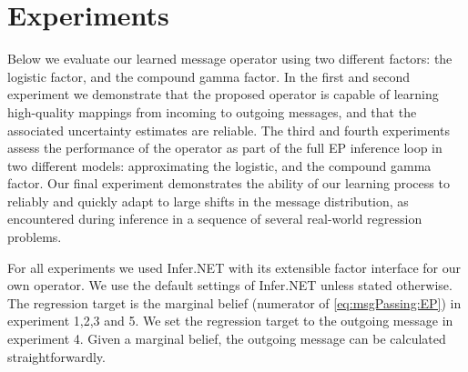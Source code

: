 \documentclass[english]{article}
\theoremstyle{plain}
\theoremstyle{plain}
\newcommand{\factor}{f}				%
\newcommand{\msg}[2]{m_{#1 \rightarrow #2}}			%
\begin{document}
\section{Experiments  \label{sec:Experiments}}

Below we evaluate our learned message operator using two different factors: the logistic factor, and the compound gamma factor. In the first and second experiment we demonstrate that the proposed operator is capable of learning high-quality mappings from incoming to outgoing messages, and that the associated uncertainty estimates are  reliable. The third and fourth experiments assess the performance of the operator as part of the full EP inference loop in two different models: approximating the logistic, and the compound gamma factor. Our final experiment demonstrates the  ability of our learning process to reliably and quickly adapt to large shifts in the message distribution, as encountered during inference in a sequence of several real-world regression problems. 


For all experiments we used Infer.NET \citep{Minka2014} with its extensible factor interface for our own operator. 
We use the default settings of Infer.NET unless stated otherwise. 
The regression target is the marginal belief (numerator of \eqref{eq:msgPassing:EP}) in experiment 1,2,3 and 5. We set the regression target to the outgoing message in experiment 4. 
Given a marginal belief, the outgoing message can be calculated straightforwardly.


\end{document}
